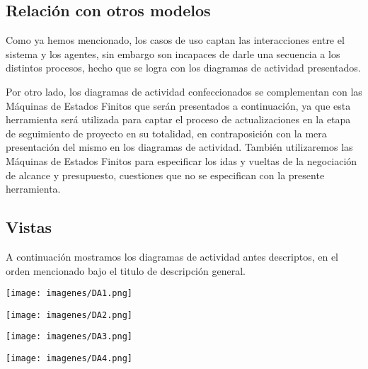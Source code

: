 \subsection{Relación con otros modelos}
Como ya hemos mencionado, los casos de uso captan las interacciones entre el sistema y los agentes, sin embargo son incapaces de darle una secuencia a los distintos procesos, hecho que se logra con los diagramas de actividad presentados.

Por otro lado, los diagramas de actividad confeccionados se complementan con las Máquinas de Estados Finitos que serán presentados a continuación, ya que esta herramienta será utilizada para captar el proceso de actualizaciones en la etapa de seguimiento de proyecto en su totalidad, en contraposición con la mera presentación del mismo en los diagramas de actividad. También utilizaremos las Máquinas de Estados Finitos para especificar los idas y vueltas de la negociación de alcance y presupuesto, cuestiones que no se especifican con la presente herramienta.

\subsection{Vistas}
A continuación mostramos los diagramas de actividad antes descriptos, en el orden mencionado bajo el titulo de descripción general.

\begin{center}
\begin{adjustbox}{max width = 1.1\textwidth}
\texttt{[image: imagenes/DA1.png]}
\end{adjustbox}
\end{center}

\newpage

\begin{center}
\begin{adjustbox}{max width = 1.1\textwidth}
\texttt{[image: imagenes/DA2.png]}
\end{adjustbox}
\end{center}

\newpage

\begin{center}
\begin{adjustbox}{max width = 1.1\textwidth}
\texttt{[image: imagenes/DA3.png]}
\end{adjustbox}
\end{center}

\newpage

\begin{center}
\begin{adjustbox}{max width = 1.1\textwidth}
\texttt{[image: imagenes/DA4.png]}
\end{adjustbox}
\end{center}
